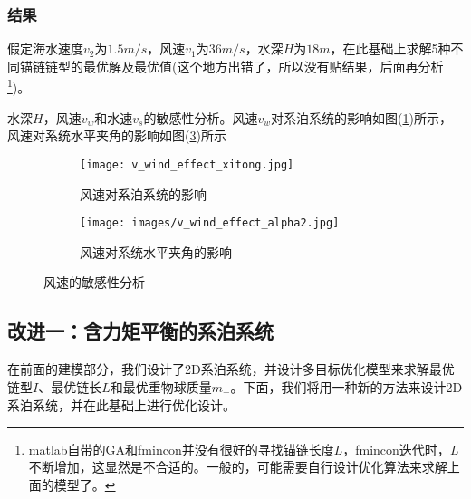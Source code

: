         \subsubsection{结果}
            \par
            假定海水速度$v_2$为$1.5m/s$，风速$v_1$为$36m/s$，水深$H$为$18m$，在此基础上求解5种不同锚链链型的最优解及最优值(这个地方出错了，所以没有贴结果，后面再分析\footnote{matlab自带的GA和fmincon并没有很好的寻找锚链长度$L$，fmincon迭代时，$L$不断增加，这显然是不合适的。一般的，可能需要自行设计优化算法来求解上面的模型了。})。
            \par
            水深$H$，风速$v_w$和水速$v_s$的敏感性分析。风速$v_w$对系泊系统的影响如图(\ref{风速对系泊系统的影响})所示，风速对系统水平夹角的影响如图(\ref{风速对系统水平夹角的影响})所示
            \begin{figure}[H]
                \centering
                \begin{subfigure}[b]{0.4\textwidth}
                    \texttt{[image: v\_wind\_effect\_xitong.jpg]}
                    \caption{风速对系泊系统的影响}
                    \label{风速对系泊系统的影响}
                \end{subfigure}
                \begin{subfigure}[b]{0.4\textwidth}
                    \texttt{[image: images/v\_wind\_effect\_alpha2.jpg]}
                    \caption{风速对系统水平夹角的影响}
                    \label{风速对系统水平夹角的影响}
                \end{subfigure}
                \caption{风速的敏感性分析}
            \end{figure}

    \subsection{改进一：含力矩平衡的系泊系统}
        \par
        在前面的建模部分，我们设计了2D系泊系统，并设计多目标优化模型来求解最优链型$I$、最优链长$L$和最优重物球质量$m_+$。下面，我们将用一种新的方法来设计2D系泊系统，并在此基础上进行优化设计。

